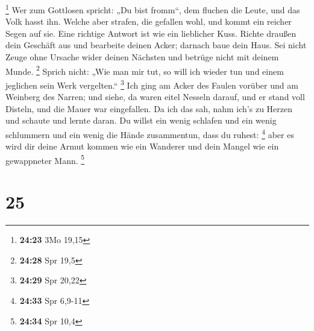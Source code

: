 \footnote{\textbf{24:23} 3Mo 19,15}  Wer zum Gottlosen
spricht: „Du bist fromm``, dem fluchen die Leute, und das Volk hasst
ihn.  Welche aber strafen, die gefallen wohl, und kommt ein
reicher Segen auf sie.  Eine richtige Antwort ist wie ein
lieblicher Kuss.  Richte draußen dein Geschäft aus und
bearbeite deinen Acker; darnach baue dein Haus.  Sei nicht
Zeuge ohne Ursache wider deinen Nächsten und betrüge nicht mit deinem
Munde. \footnote{\textbf{24:28} Spr 19,5}  Sprich nicht:
„Wie man mir tut, so will ich wieder tun und einem jeglichen sein Werk
vergelten.`` \footnote{\textbf{24:29} Spr 20,22}  Ich ging
am Acker des Faulen vorüber und am Weinberg des Narren; 
und siehe, da waren eitel Nesseln darauf, und er stand voll Disteln, und
die Mauer war eingefallen.  Da ich das sah, nahm ich's zu
Herzen und schaute und lernte daran.  Du willst ein wenig
schlafen und ein wenig schlummern und ein wenig die Hände zusammentun,
dass du ruhest: \footnote{\textbf{24:33} Spr 6,9-11}  aber
es wird dir deine Armut kommen wie ein Wanderer und dein Mangel wie ein
gewappneter Mann. \footnote{\textbf{24:34} Spr 10,4}

\hypertarget{section-12}{%
\section{25}\label{section-12}}


